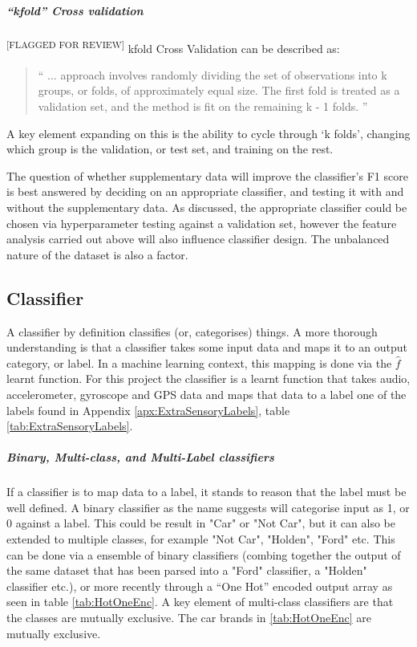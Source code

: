 \documentclass{UoNMCHA}
\newcommand{\flagforreview}{\textsuperscript{\color{red} [FLAGGED FOR REVIEW]}}
\newcommand{\inlineQuote}[1]{``#1''}
\newcommand{\fancyquote}[1]{\begin{quotation}\inlineQuote{#1}\end{quotation}}
\numberwithin{equation}{section}
\begin{document}
\subparagraph{\inlineQuote{kfold} Cross validation} \flagforreview
kfold Cross Validation can be described as:
\fancyquote{
    ... approach involves randomly dividing the set of observations into k groups, or folds, of approximately equal size. The first fold is treated as a validation set, and the method is fit on the remaining k - 1 folds. 
    } \cite{James2017}
A key element expanding on this is the ability to cycle through `k folds', changing which group is the validation, or test set, and training on the rest.

The question of whether supplementary data will improve the classifier's F1 score is best answered by deciding on an appropriate classifier, and testing it with and without the supplementary data. As discussed, the appropriate classifier could be chosen via hyperparameter testing against a validation set, however the feature analysis carried out above will also influence classifier design. The unbalanced nature of the dataset is also a factor.


\subsection{Classifier}

A classifier by definition classifies (or, categorises) things. A more thorough understanding is that a classifier takes some input data and maps it to an output category, or label. In a machine learning context, this mapping is done via the $\hat{f}$ learnt function. For this project the classifier is a learnt function that takes audio, accelerometer, gyroscope and GPS data and maps that data to a label one of the labels found in Appendix \ref{apx:ExtraSensoryLabels}, table \ref{tab:ExtraSensoryLabels}. 

\subparagraph{Binary, Multi-class, and  Multi-Label classifiers}
If a classifier is to map data to a label, it stands to reason that the label must be well defined. A binary classifier as the name suggests will categorise input as 1, or 0 against a label. This could be result in "Car" or "Not Car", but it can also be extended to multiple classes, for example "Not Car", "Holden", "Ford" etc. This can be done via a ensemble of binary classifiers (combing together the output of the same dataset that has been parsed into a "Ford" classifier, a "Holden" classifier etc.), or more recently through a \inlineQuote{One Hot} \cite{huffman1954the} encoded output array as seen in table \ref{tab:HotOneEnc}. A key element of multi-class classifiers are that the classes are mutually exclusive. The car brands in \ref{tab:HotOneEnc} are mutually exclusive.
\end{document}
